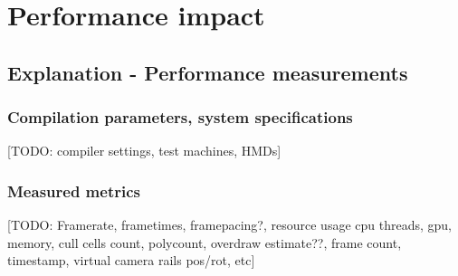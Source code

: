 
\chapter{Performance impact}
\section{Explanation - Performance measurements}
\subsection{Compilation parameters, system specifications}
[TODO: compiler settings, test machines, HMDs]
\subsection{Measured metrics}
[TODO: Framerate, frametimes, framepacing?, resource usage cpu threads, gpu, memory, cull cells count, polycount, overdraw estimate??, frame count, timestamp, virtual camera rails pos/rot, etc]